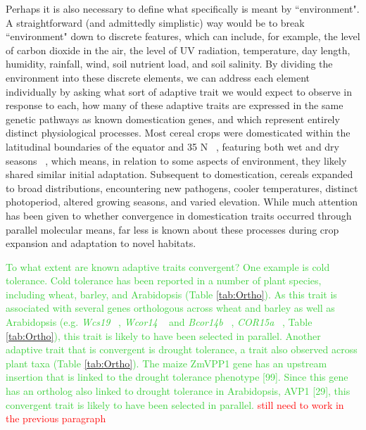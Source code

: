 \documentclass[12pt]{article}
\newcommand{\mbh}[1]{\textcolor{red}{\normalsize  #1}}
\newcommand{\mw}[1]{\textcolor{LimeGreen}{\normalsize #1}}
\begin{document}
Perhaps it is also necessary to define what specifically is meant by ``environment".
A straightforward (and admittedly simplistic) way would be to break ``environment" down to discrete features, which can include, for example, the level of carbon dioxide in the air, the level of UV radiation, temperature, day length, humidity, rainfall, wind, soil nutrient load, and soil salinity. 
By dividing the environment into these discrete elements, we can address each element individually by asking what sort of adaptive trait we would expect to observe in response to each, how many of these adaptive traits are expressed in the same genetic pathways as known domestication genes, and which represent entirely distinct physiological processes.
Most cereal crops were domesticated within the latitudinal boundaries of the equator and 35 N ~\citep{Jain1993, Gepts2010}, featuring both wet and dry seasons ~\citep{Jain1993}, which means, in relation to some aspects of environment, they likely shared similar initial adaptation.
Subsequent to domestication, cereals expanded to broad distributions, encountering new pathogens, cooler temperatures, distinct photoperiod, altered growing seasons, and varied elevation.
While much attention has been given to whether convergence in domestication traits occurred through parallel molecular means, far less is known about these processes during crop expansion and adaptation to novel habitats.

\mw{To what extent are known adaptive traits convergent? One example is cold tolerance. Cold tolerance has been reported in a number of plant species, including wheat, barley, and Arabidopsis (Table \ref{tab:Ortho}). As this trait is associated with several genes orthologous across wheat and barley as well as Arabidopsis (e.g.  \textit{Wcs19} ~\citep{pmid8219063}, \textit{Wcor14} ~\citep{pmid10846621} and \textit{Bcor14b} ~\citep{pmid9952464}, \textit{COR15a}  ~\citep{pmid9826741, Takumi2003}, Table \ref{tab:Ortho}), this trait is likely to have been selected in parallel.  Another adaptive trait that is convergent is drought tolerance, a trait also observed across plant taxa (Table \ref{tab:Ortho}). The maize ZmVPP1 gene has an upstream insertion that is linked to the drought tolerance phenotype [99]. Since this gene has an ortholog also linked to drought tolerance in Arabidopsis, AVP1 [29], this convergent trait is likely to have been selected in parallel. }
\mbh{still need to work in the previous paragraph}


\paragraph{}
\end{document}
